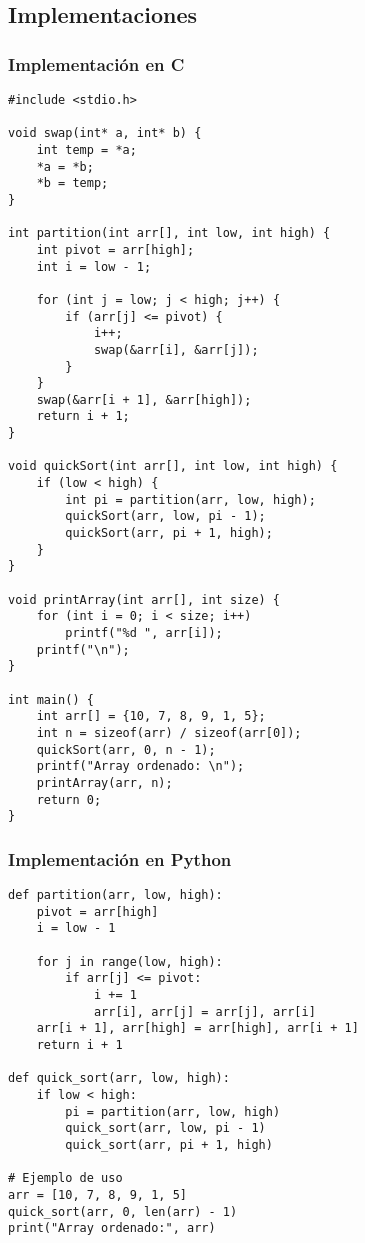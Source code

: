 \documentclass[11pt,openany]{book}
\begin{document}
\subsection{Implementaciones}

\subsubsection{Implementación en C}
\lstset{language=C}
\begin{lstlisting}
#include <stdio.h>

void swap(int* a, int* b) {
    int temp = *a;
    *a = *b;
    *b = temp;
}

int partition(int arr[], int low, int high) {
    int pivot = arr[high];
    int i = low - 1;

    for (int j = low; j < high; j++) {
        if (arr[j] <= pivot) {
            i++;
            swap(&arr[i], &arr[j]);
        }
    }
    swap(&arr[i + 1], &arr[high]);
    return i + 1;
}

void quickSort(int arr[], int low, int high) {
    if (low < high) {
        int pi = partition(arr, low, high);
        quickSort(arr, low, pi - 1);
        quickSort(arr, pi + 1, high);
    }
}

void printArray(int arr[], int size) {
    for (int i = 0; i < size; i++)
        printf("%d ", arr[i]);
    printf("\n");
}

int main() {
    int arr[] = {10, 7, 8, 9, 1, 5};
    int n = sizeof(arr) / sizeof(arr[0]);
    quickSort(arr, 0, n - 1);
    printf("Array ordenado: \n");
    printArray(arr, n);
    return 0;
}
\end{lstlisting}

\subsubsection{Implementación en Python}
\lstset{language=Python}
\begin{lstlisting}
def partition(arr, low, high):
    pivot = arr[high]
    i = low - 1

    for j in range(low, high):
        if arr[j] <= pivot:
            i += 1
            arr[i], arr[j] = arr[j], arr[i]
    arr[i + 1], arr[high] = arr[high], arr[i + 1]
    return i + 1

def quick_sort(arr, low, high):
    if low < high:
        pi = partition(arr, low, high)
        quick_sort(arr, low, pi - 1)
        quick_sort(arr, pi + 1, high)

# Ejemplo de uso
arr = [10, 7, 8, 9, 1, 5]
quick_sort(arr, 0, len(arr) - 1)
print("Array ordenado:", arr)
\end{lstlisting}
\end{document}
